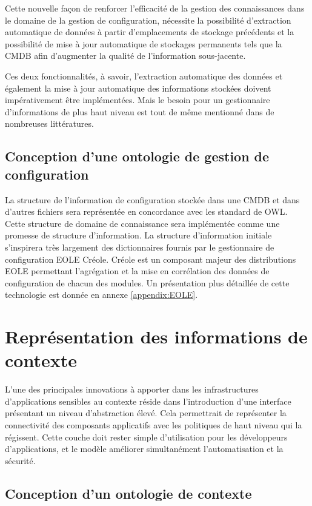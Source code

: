 Cette nouvelle façon de renforcer l'efficacité de la gestion des connaissances
dans le domaine de la gestion de configuration, nécessite la possibilité
d'extraction automatique de données à partir d'emplacements de stockage
précédents et la possibilité de mise à jour automatique de stockages permanents
tels que la CMDB afin d'augmenter la qualité de l'information sous-jacente.

Ces deux fonctionnalités, à savoir, l'extraction automatique des
données et également la mise à jour automatique des informations stockées
doivent impérativement être implémentées. Mais le besoin pour un gestionnaire
d'informations de plus haut niveau est tout de même mentionné dans de nombreuses
littératures.

\subsection{Conception d'une ontologie de gestion de configuration}

La structure de l'information de configuration stockée dans une CMDB et dans
d'autres fichiers sera représentée en concordance avec les standard de OWL.
Cette structure de domaine de connaissance sera implémentée comme une promesse
de structure d'information. La structure d'information initiale s'inspirera très
largement des dictionnaires fournis par le gestionnaire de configuration EOLE
Créole. Créole est un composant majeur des distributions EOLE permettant
l'agrégation et la mise en corrélation des données de configuration de chacun
des modules. Un présentation plus détaillée de cette technologie est donnée en
annexe \ref{appendix:EOLE}.

\section{Représentation des informations de contexte}

L'une des principales innovations à apporter dans les infrastructures
d'applications sensibles au contexte réside dans l'introduction d'une interface
présentant un niveau d'abstraction élevé. Cela permettrait de représenter la
connectivité des composants applicatifs avec les politiques de haut niveau qui
la régissent. Cette couche doit rester simple d'utilisation pour les
développeurs d'applications, et le modèle améliorer simultanément
l'automatisation et la sécurité.

\subsection{Conception d'un ontologie de contexte}
\label{sec:ontology}

